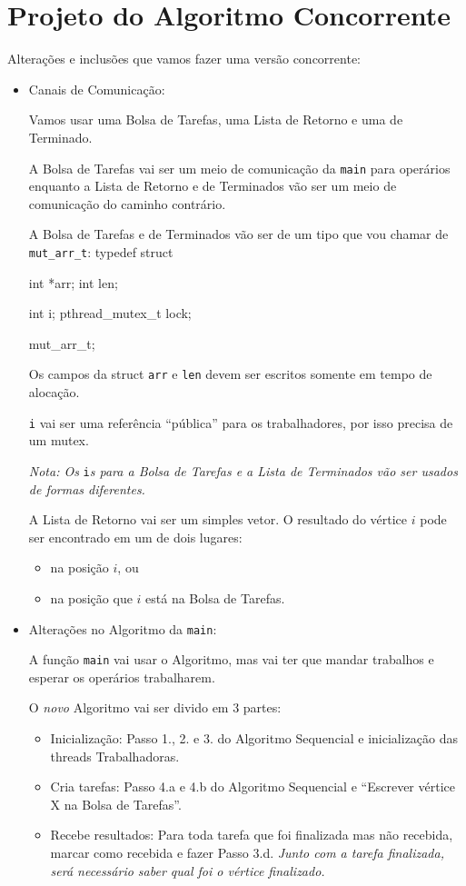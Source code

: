 \documentclass[12pt]{article}
\newenvironment{code}{\verbatim}{\endverbatim}
\newcommand{\ti}{\textit}
\begin{document}
\newpage
\section{Projeto do Algoritmo Concorrente}

Alterações e inclusões que vamos fazer uma versão concorrente:
\begin{itemize}
	\item Canais de Comunicação:

		Vamos usar uma Bolsa de Tarefas, uma Lista de Retorno
		e uma de Terminado.

		A Bolsa de Tarefas vai ser um meio de comunicação da
		\verb.main. para operários
		enquanto a Lista de Retorno e de Terminados vão
		ser um meio de comunicação do caminho contrário.

		A Bolsa de Tarefas e de Terminados
		vão ser de um tipo que vou chamar de \verb.mut_arr_t.:
		\begin{code}
		    typedef struct {
		        int *arr;
		        int len;

		        int i;
		        pthread_mutex_t lock;
		     } mut_arr_t;
		\end{code}

		Os campos da struct \verb.arr. e \verb.len.
		devem ser escritos somente em tempo de alocação.

		\verb.i. vai ser uma referência ``pública''
		para os trabalhadores, por isso precisa de um mutex.

		\ti{
			Nota: Os} \verb.i.\ti{s para a Bolsa de Tarefas e a
			Lista de Terminados vão ser usados de formas diferentes.
		}

		A Lista de Retorno vai ser um simples vetor.
		O resultado do vértice $i$ pode ser encontrado
		em um de dois lugares: 
		\begin{itemize}
			\item na posição $i$, ou
			\item na posição que $i$ está na Bolsa de Tarefas.
		\end{itemize}

	\item Alterações no Algoritmo da \verb.main.:

		A função \verb.main. vai usar o Algoritmo,
		mas vai ter que mandar trabalhos e esperar
		os operários trabalharem.

		O \ti{novo} Algoritmo vai ser divido em 3 partes:
		\begin{itemize}
			\item Inicialização:
				Passo 1., 2. e 3. do Algoritmo Sequencial
				e inicialização das threads Trabalhadoras.
			\item Cria tarefas:
				Passo 4.a e 4.b do Algoritmo Sequencial
				e ``Escrever vértice X na Bolsa de Tarefas''.
			\item Recebe resultados:
				Para toda tarefa que foi finalizada mas não recebida,
				marcar como recebida e fazer Passo 3.d.
				\ti{
					Junto com a tarefa finalizada,
					será necessário saber qual foi o vértice finalizado.
				}
		\end{itemize}


\end{itemize}
\end{document}
